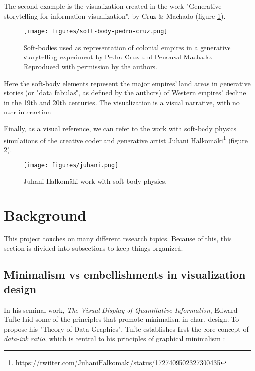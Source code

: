 \documentclass[manuscript, screen]{timtm}
\begin{document}
The second example is the visualization created in the work "Generative storytelling for information visualization", by Cruz \& Machado \cite{Cruz-soft-body} (figure \ref{fig:soft-body-pedro}). 

\begin{figure}[h]
  \centering
  \texttt{[image: figures/soft-body-pedro-cruz.png]}
  \caption{Soft-bodies used as representation of colonial empires in a generative storytelling experiment by Pedro Cruz and Penousal Machado. Reproduced with permission by the authors.}
  \label{fig:soft-body-pedro}
\end{figure}

Here the soft-body elements represent the major empires' land areas in generative stories (or "data fabulas", as defined by the authors) of Western empires’ decline in the 19th and 20th centuries. The visualization is a visual narrative, with no user interaction.

Finally, as a visual reference, we can refer to the work with soft-body physics simulations of the creative coder and generative artist Juhani Halkomäki\footnote{https://twitter.com/JuhaniHalkomaki/status/1727409502327300435} (figure \ref{fig:juhani}).

\begin{figure}[h]
  \centering
  \texttt{[image: figures/juhani.png]}
  \caption{Juhani Halkomäki work with soft-body physics.}
  \label{fig:juhani}
\end{figure}

\section{Background}

This project touches on many different research topics. Because of this, this section is divided into subsections to keep things organized.

\subsection{Minimalism vs embellishments in visualization design} \label{background-minimalism}

In his seminal work, \textit{The Visual Display of Quantitative Information}, Edward Tufte laid some of the principles that promote minimalism in chart design. To propose his "Theory of Data Graphics", Tufte establishes first the core concept of \textit{data-ink ratio}, which is central to his principles of graphical minimalism \cite{tufte2001visual}:
\end{document}
